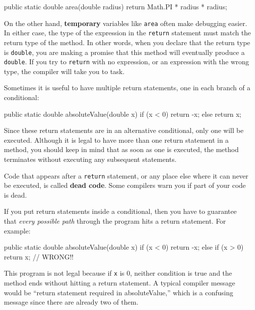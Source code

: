 \begin{code}
  public static double area(double radius) {
    return Math.PI * radius * radius;
  }
\end{code}

On the other hand, {\bf temporary} variables like {\tt area} often
make debugging easier.  In either case, the type of the expression in
the {\tt return} statement must match the return type of the method.
In other words, when you declare that the return type is {\tt double},
you are making a promise that this method will eventually
produce a {\tt double}.  If you try to {\tt return} with no
expression, or an expression with the wrong type, the compiler will
take you to task.


Sometimes it is useful to have multiple return
statements, one in each branch of a conditional:

\begin{code}
  public static double absoluteValue(double x) {
    if (x < 0) {
      return -x;
    } else {
      return x;
    }
  }
\end{code}

Since these return statements are in an alternative conditional,
only one will be executed.  Although it is legal to have more than one
return statement in a method, you should keep in mind
that as soon as one is executed, the method
terminates without executing any subsequent statements.

Code that appears after a {\tt return} statement, or any place else
where it can never be executed, is called {\bf dead code}.  Some
compilers warn you if part of your code is dead.


If you put return statements inside a conditional, then
you have to guarantee that {\em every possible path} through
the program hits a return statement.  For example:

\begin{code}
  public static double absoluteValue(double x) {
    if (x < 0) {
      return -x;
    } else if (x > 0) {
      return x;
    }                          // WRONG!!
  }
\end{code}

This program is not legal because if {\tt x} is 0,
neither condition is true and the method ends without hitting
a return statement.  A typical compiler message would be ``return
statement required in absoluteValue,'' which is a confusing message
since there are already two of them.


